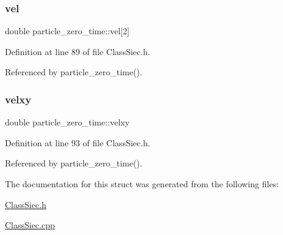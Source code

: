 \mbox{\label{structparticle__zero__time_a02135214c123f6cbc5ca706cdf47c890}} 
\subsubsection{\texorpdfstring{vel}{vel}}
{\footnotesize\ttfamily double particle\+\_\+zero\+\_\+time\+::vel\mbox{[}2\mbox{]}}



Definition at line 89 of file Class\+Siec.\+h.



Referenced by particle\+\_\+zero\+\_\+time().

\mbox{\label{structparticle__zero__time_a09c3ed1201f81f88c5719da195c3c7d1}} 
\subsubsection{\texorpdfstring{velxy}{velxy}}
{\footnotesize\ttfamily double particle\+\_\+zero\+\_\+time\+::velxy}



Definition at line 93 of file Class\+Siec.\+h.



Referenced by particle\+\_\+zero\+\_\+time().



The documentation for this struct was generated from the following files\+:\begin{DoxyCompactItemize}
\item 
\mbox{\hyperlink{ClassSiec_8h}{Class\+Siec.\+h}}\item 
\mbox{\hyperlink{ClassSiec_8cpp}{Class\+Siec.\+cpp}}\end{DoxyCompactItemize}

